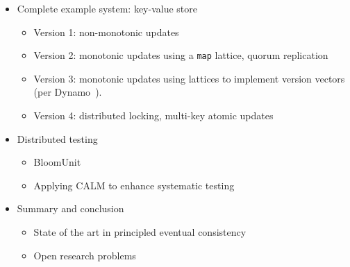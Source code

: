 \begin{itemize}
\item
  Complete example system: key-value store
  \begin{itemize}
  \item
    Version 1: non-monotonic updates
  \item
    Version 2: monotonic updates using a \texttt{map} lattice, quorum
    replication
  \item
    Version 3: monotonic updates using lattices to implement version vectors
    (per Dynamo~\cite{DeCandia2007}).
  \item
    Version 4: distributed locking, multi-key atomic updates
  \end{itemize}
\item
  Distributed testing
  \begin{itemize}
  \item
    BloomUnit
  \item
    Applying CALM to enhance systematic testing
  \end{itemize}
\item
  Summary and conclusion
  \begin{itemize}
  \item
    State of the art in principled eventual consistency
  \item
    Open research problems
  \end{itemize}
\end{itemize}





